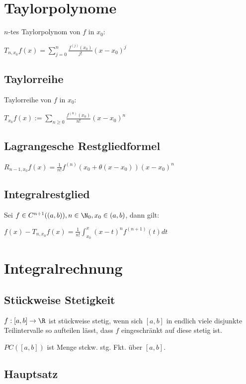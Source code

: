 \section*{Taylorpolynome}

$n$-tes Taylorpolynom von $f$ in $x_0$:

$T_{n,x_0} f(x) = \sum_{j=0}^n \frac{f^{(j)}(x_0)}{j!} (x-x_0)^j$

\subsection*{Taylorreihe}

Taylorreihe von $f$ in $x_0$:

$T_{x_0} f(x) := \sum_{n\geq0} \frac{f^{(n)}(x_0)}{n!} (x-x_0)^n$

\subsection*{Lagrangesche Restgliedformel}

$R_{n-1, x_0} f(x) = \frac{1}{n!} f^{(n)} (x_0 + \theta(x-x_0))(x-x_0)^n$

\subsection*{Integralrestglied}

Sei $f \in C^{n+1}((a, b)), n \in \N_0, x_0 \in (a, b)$, dann gilt:

$f(x) - T_{n,x_0} f(x) = \frac{1}{n!} \int_{x_0}^x (x-t)^n f^{(n+1)}(t) dt$

\section*{Integralrechnung}

\subsection*{Stückweise Stetigkeit}

$f : [a, b] \rightarrow \R$ ist stückweise stetig, wenn sich $[a, b]$ in endlich viele disjunkte Teilintervalle so aufteilen lässt, dass $f$ eingeschränkt auf diese stetig ist.

$PC([a, b])$ ist Menge stckw. stg. Fkt. über $[a, b]$.

\subsection*{Hauptsatz}

